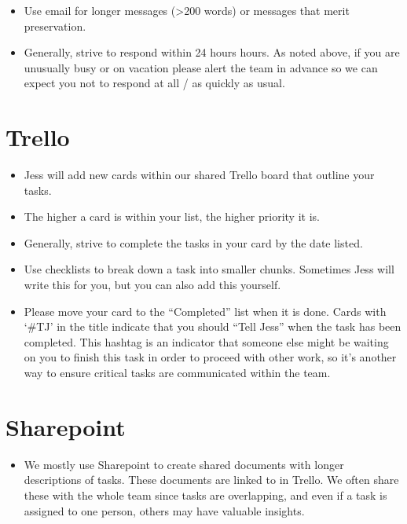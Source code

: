 \documentclass[
]{book}
\providecommand{\tightlist}{%
  \setlength{\itemsep}{0pt}\setlength{\parskip}{0pt}}
\begin{document}
\begin{itemize}
\tightlist
\item
  Use email for longer messages (\textgreater200 words) or messages that merit preservation.
\item
  Generally, strive to respond within 24 hours hours. As noted above, if you are unusually busy or on vacation please alert the team in advance so we can expect you not to respond at all / as quickly as usual.
\end{itemize}

\section{Trello}\label{trello}

\begin{itemize}
\tightlist
\item
  Jess will add new cards within our shared Trello board that outline your tasks.
\item
  The higher a card is within your list, the higher priority it is.
\item
  Generally, strive to complete the tasks in your card by the date listed.
\item
  Use checklists to break down a task into smaller chunks. Sometimes Jess will write this for you, but you can also add this yourself.
\item
  Please move your card to the ``Completed'' list when it is done. Cards with `\#TJ' in the title indicate that you should ``Tell Jess'' when the task has been completed. This hashtag is an indicator that someone else might be waiting on you to finish this task in order to proceed with other work, so it's another way to ensure critical tasks are communicated within the team.
\end{itemize}

\section{Sharepoint}\label{sharepoint}

\begin{itemize}
\tightlist
\item
  We mostly use Sharepoint to create shared documents with longer descriptions of tasks. These documents are linked to in Trello. We often share these with the whole team since tasks are overlapping, and even if a task is assigned to one person, others may have valuable insights.
\end{itemize}
\end{document}

